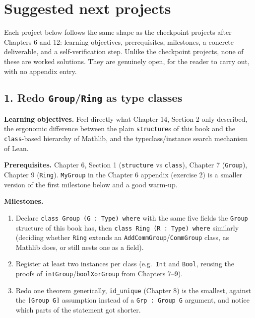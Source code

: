 \section{Suggested next projects}\label{sec:14-next-steps:03-next-projects:1}

Each project below follows the same shape as the checkpoint projects after Chapters 6 and 12: learning objectives, prerequisites, milestones, a concrete deliverable, and a self-verification step. Unlike the checkpoint projects, none of these are worked solutions. They are genuinely open, for the reader to carry out, with no appendix entry.

\subsection{\texorpdfstring{1. Redo \texttt{Group}/\texttt{Ring} as type classes}{1. Redo Group/Ring as type classes}}\label{sec:14-next-steps:03-next-projects:2}

\textbf{Learning objectives.} Feel directly what Chapter 14, Section 2 only described, the ergonomic difference between the plain \texttt{structure}s of this book and the \texttt{class}-based hierarchy of Mathlib, and the typeclass/instance search mechanism of Lean.

\textbf{Prerequisites.} Chapter 6, Section 1 (\texttt{structure} vs \texttt{class}), Chapter 7 (\texttt{Group}), Chapter 9 (\texttt{Ring}). \texttt{MyGroup} in the Chapter 6 appendix (exercise 2) is a smaller version of the first milestone below and a good warm-up.

\textbf{Milestones.}

\begin{enumerate}
\def\labelenumi{\arabic{enumi}.}
\tightlist
\item
  Declare \texttt{class Group (G : Type) where} with the same five fields the \texttt{Group} structure of this book has, then \texttt{class Ring (R : Type) where} similarly (deciding whether \texttt{Ring} extends an \texttt{AddCommGroup}/\texttt{CommGroup} class, as Mathlib does, or still nests one as a field).
\item
  Register at least two instances per class (e.g.~\texttt{Int} and \texttt{Bool}, reusing the proofs of \texttt{intGroup}/\texttt{boolXorGroup} from Chapters 7--9).
\item
  Redo one theorem generically, \texttt{id\_\allowbreak{}unique} (Chapter 8) is the smallest, against the \texttt{[Group G]} assumption instead of a \texttt{Grp : Group G} argument, and notice which parts of the statement got shorter.
\end{enumerate}

